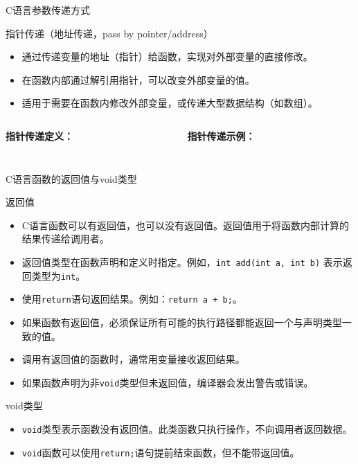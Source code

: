 \documentclass[UTF8,aspectratio=169]{beamer}
\begin{document}
\begin{frame}{C语言参数传递方式}
    \begin{ytublock}{指针传递（地址传递，pass by pointer/address）}
        \begin{itemize}
            \item 通过传递变量的地址（指针）给函数，实现对外部变量的直接修改。
            \item 在函数内部通过解引用指针，可以改变外部变量的值。
            \item 适用于需要在函数内修改外部变量，或传递大型数据结构（如数组）。
        \end{itemize}
        \begin{columns}
            \begin{column}{0.48\textwidth}
                \textbf{指针传递定义：}
                \inputminted[firstline=17,lastline=22]{cpp}{code/c_function_example.c}
            \end{column}
            \begin{column}{0.48\textwidth}
                \textbf{指针传递示例：}
                \inputminted[firstline=50,lastline=54]{cpp}{code/c_function_example.c}
            \end{column}
        \end{columns}
    \end{ytublock}
\end{frame}

\begin{frame}{C语言函数的返回值与void类型}
    \begin{ytublock}{返回值}
        \begin{itemize}
            \item C语言函数可以有返回值，也可以没有返回值。返回值用于将函数内部计算的结果传递给调用者。
            \item 返回值类型在函数声明和定义时指定。例如，\texttt{int add(int a, int b)} 表示返回类型为\texttt{int}。
            \item 使用\texttt{return}语句返回结果。例如：\texttt{return a + b;}。
            \item 如果函数有返回值，必须保证所有可能的执行路径都能返回一个与声明类型一致的值。
            \item 调用有返回值的函数时，通常用变量接收返回结果。
            \item 如果函数声明为非\texttt{void}类型但未返回值，编译器会发出警告或错误。
        \end{itemize}
    \end{ytublock}
    \begin{ytublock}{void类型}
        \begin{itemize}
            \item \texttt{void}类型表示函数没有返回值。此类函数只执行操作，不向调用者返回数据。
            \item \texttt{void}函数可以使用\texttt{return;}语句提前结束函数，但不能带返回值。
        \end{itemize}
    \end{ytublock}
\end{frame}
\end{document}
